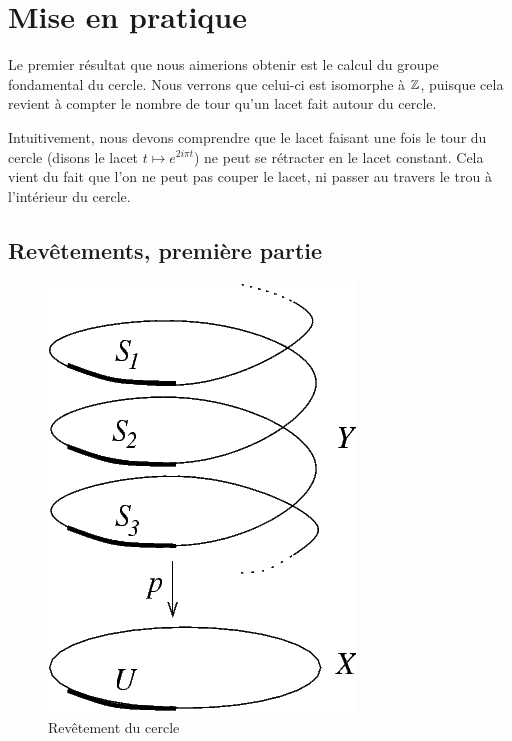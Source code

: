 \section{Mise en pratique}

Le premier résultat que nous aimerions obtenir est le calcul du groupe fondamental du cercle. Nous verrons que celui-ci est isomorphe à $\mathbb{Z}$, puisque cela revient à compter le nombre de tour qu'un lacet fait autour du cercle.

Intuitivement, nous devons comprendre que le lacet faisant une fois le tour du cercle (disons le lacet $t\mapsto e^{2i\pi t}$) ne peut se rétracter en le lacet constant. Cela vient du fait que l'on ne peut pas couper le lacet, ni passer au travers le trou à l'intérieur du cercle.

\subsection{Revêtements, première partie}\label{covering-space-intro}

\begin{figure}
    \centering
    \includegraphics[width=.9\linewidth]{pictures/covering-map-circle.png}
    \caption{\centering Revêtement du cercle}
    \label{fig:cover-circle}
\end{figure}

